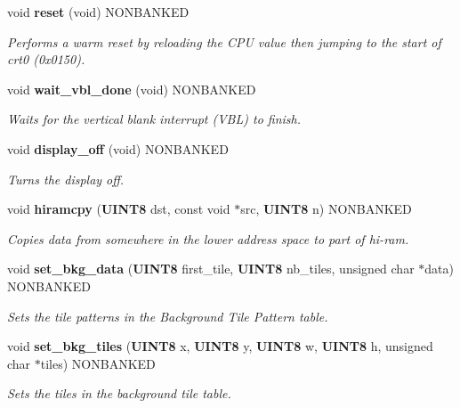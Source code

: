 \begin{CompactItemize}
\item 
\label{gb.h_a74}
void {\bf reset} (void) NONBANKED
\begin{CompactList}\small\item\em Performs a warm reset by reloading the CPU value then jumping to the start of crt0 (0x0150).\item\end{CompactList}

\item 
void {\bf wait\_\-vbl\_\-done} (void) NONBANKED
\begin{CompactList}\small\item\em Waits for the vertical blank interrupt (VBL) to finish.\item\end{CompactList}

\item 
void {\bf display\_\-off} (void) NONBANKED
\begin{CompactList}\small\item\em Turns the display off.\item\end{CompactList}

\item 
void {\bf hiramcpy} ({\bf UINT8} dst, const void $\ast$src, {\bf UINT8} n) NONBANKED
\begin{CompactList}\small\item\em Copies data from somewhere in the lower address space to part of hi-ram.\item\end{CompactList}

\item 
void {\bf set\_\-bkg\_\-data} ({\bf UINT8} first\_\-tile, {\bf UINT8} nb\_\-tiles, unsigned char $\ast$data) NONBANKED
\begin{CompactList}\small\item\em Sets the tile patterns in the Background Tile Pattern table.\item\end{CompactList}

\item 
void {\bf set\_\-bkg\_\-tiles} ({\bf UINT8} x, {\bf UINT8} y, {\bf UINT8} w, {\bf UINT8} h, unsigned char $\ast$tiles) NONBANKED
\begin{CompactList}\small\item\em Sets the tiles in the background tile table.\item\end{CompactList}


\end{CompactItemize}
